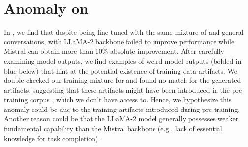 \section{\modelname Anomaly on \evalname}
\label{sec:llama_anomaly}

In , we find that despite being fine-tuned with the same mixture of \dataname and general conversations, \modelname with LLaMA-2 backbone failed to improve performance while Mistral can obtain more than 10\% absolute improvement.
% 
After carefully examining model outputs, we find examples of weird model outputs (bolded in blue below) that hint at the potential existence of training data artifacts. We double-checked our training mixture for \modelname and found no match for the generated artifacts, suggesting that these artifacts might have been introduced in the pre-training corpus \citep{touvron2023llama}, which we don't have access to.
% 
Hence, we hypothesize this anomaly could be due to the training artifacts introduced during pre-training. Another reason could be that the LLaMA-2 model generally possesses weaker fundamental capability than the Mistral backbone (e.g., lack of essential knowledge for task completion).

